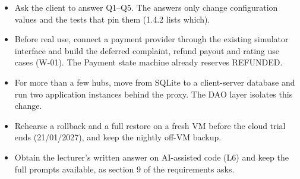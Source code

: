 \begin{itemize}
\item Ask the client to answer Q1--Q5. The answers only change configuration values and the tests that pin them (1.4.2 lists which).

\item Before real use, connect a payment provider through the existing simulator interface and build the deferred complaint, refund payout and rating use cases (W-01). The Payment state machine already reserves REFUNDED.

\item For more than a few hubs, move from SQLite to a client-server database and run two application instances behind the proxy. The DAO layer isolates this change.

\item Rehearse a rollback and a full restore on a fresh VM before the cloud trial ends (21/01/2027), and keep the nightly off-VM backup.

\item Obtain the lecturer's written answer on AI-assisted code (L6) and keep the full prompts available, as section 9 of the requirements asks.

\end{itemize}
